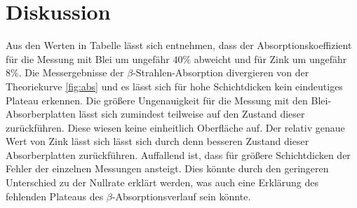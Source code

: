 \section{Diskussion}
\label{sec:Diskussion}
Aus den Werten in Tabelle lässt sich entnehmen, dass der Absorptionskoeffizient für die Messung mit Blei um ungefähr $40\%$ abweicht und für Zink um ungefähr $8\%$.
Die Messergebnisse der $\beta$-Strahlen-Absorption divergieren von der Theoriekurve \ref{fig:abs} und es lässt sich für hohe Schichtdicken kein eindeutiges Plateau erkennen.
Die größere Ungenauigkeit für die Messung mit den Blei-Absorberplatten lässt sich zumindest teilweise auf den Zustand dieser zurückführen.
Diese wiesen keine einheitlich Oberfläche auf.
Der relativ genaue Wert von Zink lässt sich lässt sich durch denn besseren Zustand dieser Absorberplatten zurückführen.
Auffallend ist, dass für größere Schichtdicken der Fehler der einzelnen Messungen ansteigt.
Dies könnte durch den geringeren Unterschied zu der Nullrate erklärt werden, was auch eine Erklärung des fehlenden Plateaus des $\beta$-Absorptionsverlauf sein könnte.
